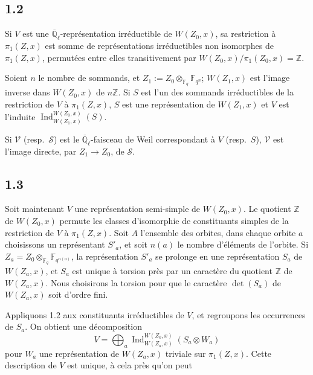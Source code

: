 \documentclass[11pt,a4paper]{article}
\theoremstyle{plain}
\theoremstyle{definition}
\DeclareMathOperator{\Ind}{Ind}
\begin{document}
\subsection{1.2}

Si $V$ est une $\overline{\mathbb{Q}}_\ell$-repr\'esentation irr\'eductible de $W(Z_0,x)$, sa restriction \`a $\pi_1(Z,x)$ est somme de repr\'esentations irr\'eductibles non isomorphes de $\pi_1(Z,x)$, permut\'ees entre elles transitivement par $W(Z_0,x)/\pi_1(Z_0,x) = \mathbb{Z}$.

Soient $n$ le nombre de sommands, et $Z_1 := Z_0 \otimes_{\mathbb{F}_q} \mathbb{F}_{q^n}$; $W(Z_1,x)$ est l'image inverse dans $W(Z_0,x)$ de $n\mathbb{Z}$. Si $S$ est l'un des sommands irr\'eductibles de la restriction de $V$ \`a $\pi_1(Z,x)$, $S$ est une repr\'esentation de $W(Z_1,x)$ et $V$ est l'induite $\Ind_{W(Z_1,x)}^{W(Z_0,x)}(S)$.

Si $\mathcal{V}$ (resp.~$\mathcal{S}$) est le $\overline{\mathbb{Q}}_\ell$-faisceau de Weil correspondant \`a $V$ (resp.~$S$), $\mathcal{V}$ est l'image directe, par $Z_1 \to Z_0$, de $\mathcal{S}$.

\subsection{1.3}

Soit maintenant $V$ une repr\'esentation semi-simple de $W(Z_0,x)$. Le quotient $\mathbb{Z}$ de $W(Z_0,x)$ permute les classes d'isomorphie de constituants simples de la restriction de $V$ \`a $\pi_1(Z,x)$. Soit $A$ l'ensemble des orbites, dans chaque orbite $a$ choisissons un repr\'esentant $S'_a$, et soit $n(a)$ le nombre d'\'el\'ements de l'orbite. Si $Z_a = Z_0 \otimes_{\mathbb{F}_q} \mathbb{F}_{q^{n(a)}}$, la repr\'esentation $S'_a$ se prolonge en une repr\'esentation $S_a$ de $W(Z_a,x)$, et $S_a$ est unique \`a torsion pr\`es par un caract\`ere du quotient $\mathbb{Z}$ de $W(Z_a,x)$. Nous choisirons la torsion pour que le caract\`ere $\det(S_a)$ de $W(Z_a,x)$ soit d'ordre fini.

Appliquons 1.2 aux constituants irr\'eductibles de $V$, et regroupons les occurrences de $S_a$. On obtient une d\'ecomposition
\begin{equation}\label{eq:1.3.1}
V = \bigoplus_a \Ind_{W(Z_a,x)}^{W(Z_0,x)}(S_a \otimes W_a)
\end{equation}
pour $W_a$ une repr\'esentation de $W(Z_a,x)$ triviale sur $\pi_1(Z,x)$. Cette description de $V$ est unique, \`a cela pr\`es qu'on peut
\end{document}
